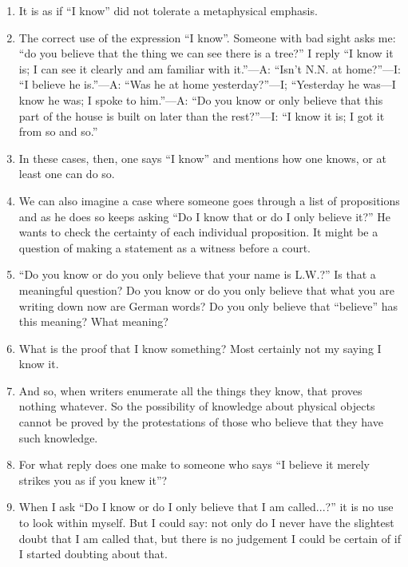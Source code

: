 \documentclass{book}
\begin{document}
\begin{enumerate}
\item
It is as if ``I know'' did not tolerate a metaphysical emphasis.

\item
The correct use of the expression ``I know''. Someone with bad sight asks me:
``do you believe that the thing we can see there is a tree?'' I reply ``I know
it is; I can see it clearly and am familiar with it.''---A: ``Isn't N.N. at
home?''---I: ``I believe he is.''---A: ``Was he at home yesterday?''---I;
``Yesterday he was---I know he was; I spoke to him.''---A: ``Do you know or
only believe that this part of the house is built on later than the
rest?''---I: ``I know it is; I got it from so and so.''

\item
In these cases, then, one says ``I know'' and mentions how one knows, or at
least one can do so.

\item
We can also imagine a case where someone goes through a list of propositions
and as he does so keeps asking ``Do I know that or do I only believe it?'' He
wants to check the certainty of each individual proposition. It might be a
question of making a statement as a witness before a court.

\item
``Do you know or do you only believe that your name is L.W.?'' Is that a
meaningful question?  Do you know or do you only believe that what you are
writing down now are German words? Do you only believe that ``believe'' has
this meaning? What meaning?

\item
What is the proof that I know something? Most certainly not my saying I know
it.

\item
And so, when writers enumerate all the things they know, that proves nothing
whatever.  So the possibility of knowledge about physical objects cannot be
proved by the protestations of those who believe that they have such knowledge.

\item
For what reply does one make to someone who says ``I believe it merely strikes
you as if you knew it''?

\item
When I ask ``Do I know or do I only believe that I am called...?'' it is no use
to look within myself.  But I could say: not only do I never have the slightest
doubt that I am called that, but there is no judgement I could be certain of if
I started doubting about that.


\end{enumerate}
\end{document}
